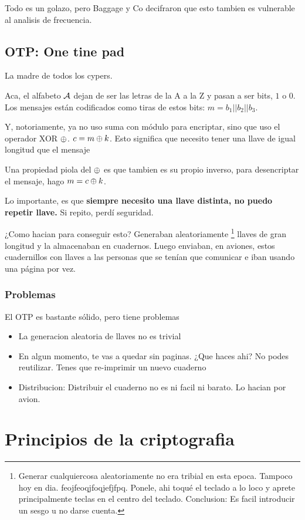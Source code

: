 \documentclass[12pt,a4paper]{report}
\begin{document}
Todo es un golazo, pero Baggage y Co decifraron que esto tambien es vulnerable al analisis de frecuencia.

\subsection{OTP: One tine pad}
\label{otp}
La madre de todos los cypers.

Aca, el alfabeto $\mathcal{{A}}$ dejan de ser las letras de la A a la Z y pasan a ser bits, $1$ o $0$. Los mensajes están codificados como tiras de estos bits: $m = b_1 || b_2 || b_3$.

Y, notoriamente, ya no uso suma con módulo para encriptar, sino que uso el operador XOR $\oplus$. $c = m \oplus k$. Esto significa que necesito tener una llave de igual longitud que el mensaje

Una propiedad piola del $\oplus$ es que tambien es su propio inverso, para desencriptar el mensaje, hago $m = c \oplus k$.

Lo importante, es que \textbf{siempre necesito una llave distinta, no puedo repetir llave.} Si repito, perdí seguridad.

¿Como hacian para conseguir esto? Generaban aleatoriamente \footnote{Generar cualquiercosa aleatoriamente no era tribial en esta epoca. Tampoco hoy en dia. feojfeoqjfoqjefjfpq. Ponele, ahi toqué el teclado a lo loco y aprete principalmente teclas en el centro del teclado. Conclusion: Es facil introducir un sesgo u no darse cuenta.} llaves de gran longitud y la almacenaban en cuadernos.
Luego enviaban, en aviones, estos cuadernillos con llaves a las personas que se tenían que comunicar e iban usando una página por vez.

\subsubsection{Problemas}
El OTP es bastante sólido, pero tiene problemas

\begin{itemize}
  \item{La generacion aleatoria de llaves no es trivial}
  \item{En algun momento, te vas a quedar sin paginas. ¿Que haces ahi? No podes reutilizar. Tenes que re-imprimir un nuevo cuaderno}
  \item{Distribucion: Distribuir el cuaderno no es ni facil ni barato. Lo hacian por avion.}
\end{itemize}

\section{Principios de la criptografia}
\end{document}

